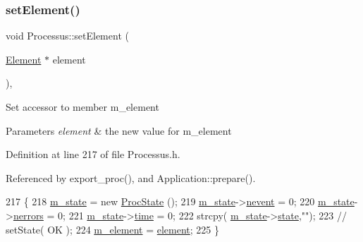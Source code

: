 \subsubsection{\texorpdfstring{set\+Element()}{setElement()}}
{\footnotesize\ttfamily void Processus\+::set\+Element (\begin{DoxyParamCaption}\item[{\hyperlink{classElement}{Element} $\ast$}]{element }\end{DoxyParamCaption})\hspace{0.3cm}{\ttfamily [inline]}, {\ttfamily [inherited]}}

Set accessor to member m\+\_\+element 
\begin{DoxyParams}{Parameters}
{\em element} & the new value for m\+\_\+element \\
\hline
\end{DoxyParams}


Definition at line 217 of file Processus.\+h.



Referenced by export\+\_\+proc(), and Application\+::prepare().


\begin{DoxyCode}
217                                      \{
218     \hyperlink{classProcessus_ab3539eee42891ceae0baf4395ae7fb61}{m\_state} = \textcolor{keyword}{new} \hyperlink{structProcState}{ProcState} ();
219     \hyperlink{classProcessus_ab3539eee42891ceae0baf4395ae7fb61}{m\_state}->\hyperlink{structProcState_a1881d6b0db849a8af15f586ad5959260}{nevent}  = 0;
220     \hyperlink{classProcessus_ab3539eee42891ceae0baf4395ae7fb61}{m\_state}->\hyperlink{structProcState_a51a0f54ba62b07e07ac8518c5f32828d}{nerrors} = 0;
221     \hyperlink{classProcessus_ab3539eee42891ceae0baf4395ae7fb61}{m\_state}->\hyperlink{structProcState_a88c69b099d8f2b2164d478f28e87610f}{time}    = 0;
222     strcpy( \hyperlink{classProcessus_ab3539eee42891ceae0baf4395ae7fb61}{m\_state}->\hyperlink{structProcState_aaffb70e5af437e2c0d4dfc69bd0b24cd}{state},\textcolor{stringliteral}{""});
223     \textcolor{comment}{//  setState( OK );}
224     \hyperlink{classProcessus_aa9d24d53c3e52f36786cabb5d8e296e7}{m\_element} = \hyperlink{classProcessus_a6fe155527431a7190b7d44d600b9608d}{element};
225   \}
\end{DoxyCode}
\mbox{\label{classEmulateFE_a33403f61dc51ffc30c008cf5782636b1}} 

